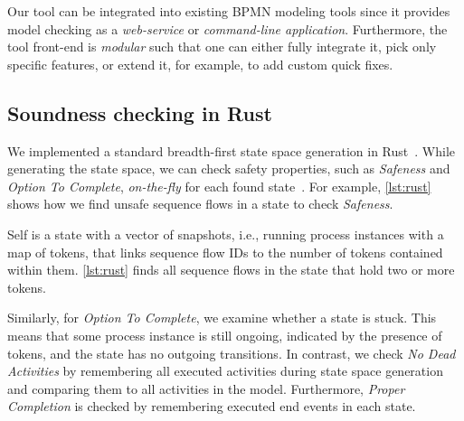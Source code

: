 \documentclass[runningheads]{llncs}
\begin{document}
Our tool can be integrated into existing BPMN modeling tools since it provides model checking as a \textit{web-service} or \textit{command-line application}.
Furthermore, the tool front-end is \textit{modular} such that one can either fully integrate it, pick only specific features, or extend it, for example, to add custom quick fixes.

\subsection{Soundness checking in Rust}
We implemented a standard breadth-first state space generation in Rust~\cite{clarkeHandbookModelChecking2018}.
While generating the state space, we can check safety properties, such as \textit{Safeness} and \textit{Option To Complete}, \textit{on-the-fly} for each found state~\cite{clarkeHandbookModelChecking2018}.
For example, \autoref{lst:rust} shows how we find unsafe sequence flows in a state to check \textit{Safeness}.

\renewcommand\thelstlisting{\arabic{lstlisting}} %


\textsf{Self} is a state with a vector of \textsf{snapshots}, i.e., running process instances with a map of \textsf{tokens}, that links sequence flow IDs to the number of tokens contained within them.
\autoref{lst:rust} finds all sequence flows in the state that hold two or more tokens.

Similarly, for \textit{Option To Complete}, we examine whether a state is stuck.
This means that some process instance is still ongoing, indicated by the presence of tokens, and the state has no outgoing transitions.
In contrast, we check \textit{No Dead Activities} by remembering all executed activities during state space generation and comparing them to all activities in the model. 
Furthermore, \textit{Proper Completion} is checked by remembering executed end events in each state.
\end{document}
